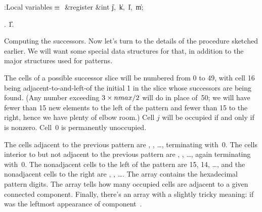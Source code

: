 \B{}:Local variables\X${}\equiv{}$\6
\&{register} \&{int} \|j${},{}$ \|k${},{}$ \|l${},{}$ \|m;\par
{}.
\U1.\fi

Computing the successors. Now let's turn to the details of the
procedure sketched earlier. We will want some special data structures
for that, in addition to the major structures used for patterns.

The cells of a possible successor slice will be numbered from 0 to 49,
with cell 16 being adjacent-to-and-left-of the initial \.1 in the
slice whose successors are being found. (Any number exceeding
$3\times\relax{\\{nmax}}/2$ will do in place of~50; we will have fewer than
15 new elements to the left of the pattern and fewer than 15 to the right,
hence we have plenty of elbow room.) Cell $j$ will be occupied if and only if
 is nonzero. Cell~0 is permanently unoccupied.

The cells adjacent to the previous pattern are , ,
\dots, terminating with~0. The cells interior to but not adjacent to
the previous pattern are , , %
\dots, again terminating
with~0. The nonadjacent cells to the left of the pattern are 15, 14, \dots,
and the nonadjacent cells to the right are , , \dots.
The array  contains the hexadecimal pattern digits.
The array  tells how many occupied cells are adjacent to a
given connected component. Finally, there's an array 
with a slightly tricky meaning:  if 
was
the leftmost appearance of component~.

